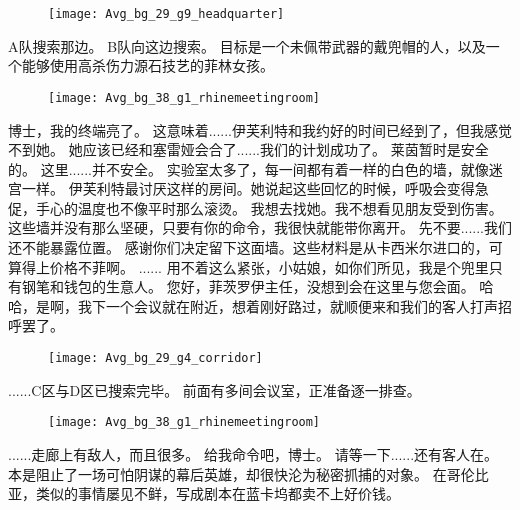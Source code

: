 \documentclass[openany]{book}
\begin{document}
\begin{figure}[h]
    \centering
    \texttt{[image: Avg\_bg\_29\_g9\_headquarter]}
\end{figure}
\begin{dialogue}
     A队搜索那边。
     B队向这边搜索。
     目标是一个未佩带武器的戴兜帽的人，以及一个能够使用高杀伤力源石技艺的菲林女孩。
\end{dialogue}

\begin{figure}[h]
    \centering
    \texttt{[image: Avg\_bg\_38\_g1\_rhinemeetingroom]}
\end{figure}
\begin{dialogue}
     博士，我的终端亮了。
     这意味着......伊芙利特和我约好的时间已经到了，但我感觉不到她。
     她应该已经和塞雷娅会合了......我们的计划成功了。
     莱茵暂时是安全的。
     这里......并不安全。
     实验室太多了，每一间都有着一样的白色的墙，就像迷宫一样。
     伊芙利特最讨厌这样的房间。她说起这些回忆的时候，呼吸会变得急促，手心的温度也不像平时那么滚烫。
     我想去找她。我不想看见朋友受到伤害。
     这些墙并没有那么坚硬，只要有你的命令，我很快就能带你离开。
     先不要......我们还不能暴露位置。
     感谢你们决定留下这面墙。这些材料是从卡西米尔进口的，可算得上价格不菲啊。
     ......
     用不着这么紧张，小姑娘，如你们所见，我是个兜里只有钢笔和钱包的生意人。
     您好，菲茨罗伊主任，没想到会在这里与您会面。
     哈哈，是啊，我下一个会议就在附近，想着刚好路过，就顺便来和我们的客人打声招呼罢了。
    \begin{figure}[h]
        \centering
        \texttt{[image: Avg\_bg\_29\_g4\_corridor]}
    \end{figure}
     ......C区与D区已搜索完毕。
     前面有多间会议室，正准备逐一排查。
    \begin{figure}[h]
        \centering
        \texttt{[image: Avg\_bg\_38\_g1\_rhinemeetingroom]}
    \end{figure}
     ......走廊上有敌人，而且很多。
     给我命令吧，博士。
     请等一下......还有客人在。
     本是阻止了一场可怕阴谋的幕后英雄，却很快沦为秘密抓捕的对象。
     在哥伦比亚，类似的事情屡见不鲜，写成剧本在蓝卡坞都卖不上好价钱。

\end{dialogue}
\end{document}
